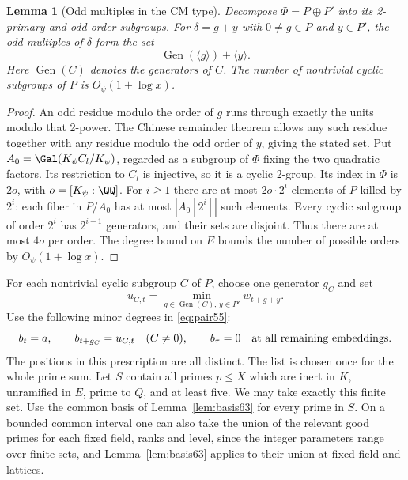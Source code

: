 \documentclass[a4paper,11pt]{article}
\newtheorem{lemma}[proposition]{Lemma}
\theoremstyle{definition}
\theoremstyle{remark}
\numberwithin{equation}{section}
\begin{document}
\begin{lemma}[Odd multiples in the CM type]\label{lem:cycles73}
Decompose \(\Phi=P\oplus P'\) into its 2-primary and odd-order
subgroups. For \(\delta=g+y\) with \(0\ne g\in P\) and
\(y\in P'\), the odd multiples of \(\delta\) form the set
\[
               \operatorname{Gen}(\langle g\rangle)
                                   +\langle y\rangle .
\]
Here \(\operatorname{Gen}(C)\) denotes the generators of
\(C\). The number of nontrivial cyclic subgroups of \(P\)
is \(O_\psi(1+\log x)\).
\end{lemma}
\begin{proof}
An odd residue modulo the order of \(g\) runs through exactly
the units modulo that 2-power. The Chinese remainder theorem
allows any such residue together with any residue modulo the
odd order of \(y\), giving the stated set. Put
\(A_0=\Gal(K_\psi C_l/K_\psi)\), regarded as a subgroup of
\(\Phi\) fixing the two quadratic factors. Its restriction
to \(C_l\) is injective, so it is a cyclic 2-group.
Its index in \(\Phi\) is \(2o\), with
\(o=[K_\psi:\QQ]\). For \(i\ge1\) there are at most
\(2o\cdot2^i\) elements of \(P\) killed by \(2^i\):
each fiber in \(P/A_0\) has at most \(|A_0[2^i]|\)
such elements. Every cyclic subgroup of order \(2^i\) has
\(2^{i-1}\) generators, and their sets are disjoint. Thus
there are at most \(4o\) per order. The degree bound on \(E\)
bounds the number of possible orders by \(O_\psi(1+\log x)\).
\end{proof}

For each nontrivial cyclic subgroup \(C\) of \(P\), choose
one generator \(g_C\) and set
\[
 u_{C,t}=\min_{g\in\operatorname{Gen}(C),\,y\in P'}
                    w_{t+g+y}.
\]
Use the following minor degrees in \eqref{eq:pair55}:
\begin{equation}
    b_t=a,\qquad b_{t+g_C}=u_{C,t}\quad(C\ne0),\qquad
    b_\tau=0\quad\hbox{at all remaining embeddings}.
                                                        \label{eq:degrees73}
\end{equation}
The positions in this prescription are all distinct. The list
is chosen once for the whole prime sum. Let \(S\) contain all
primes \(p\le X\) which are inert in \(K\), unramified in
\(E\), prime to \(Q\), and at least five. We may take exactly
this finite set. Use the common basis of Lemma~\ref{lem:basis63}
for every prime in \(S\). On a bounded common interval one
can also take the union of the relevant good primes for each
fixed field, ranks and level, since the integer parameters range over
finite sets, and Lemma~\ref{lem:basis63} applies to their
union at fixed field and lattices.
\end{document}
